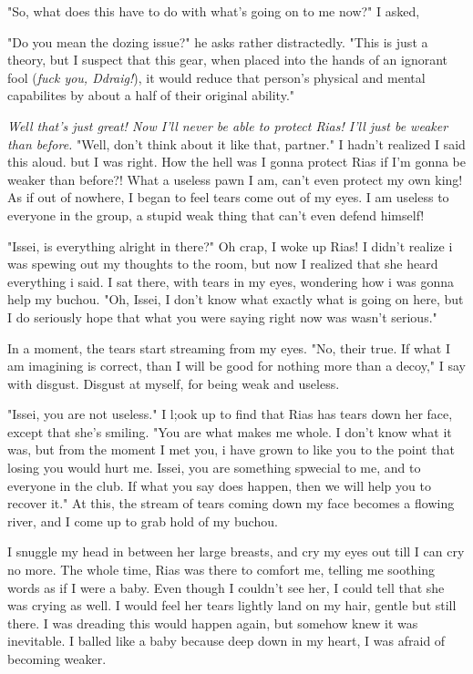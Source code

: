 \documentclass{article}
\begin{document}
"So, what does this have to do with what's going on to me now?" I asked,

"Do you mean the dozing issue?" he asks rather distractedly. "This is just a theory, but I suspect that this gear, when placed into the hands of an ignorant fool (\emph{fuck you, Ddraig!}), it would reduce that person's physical and mental capabilites by about a half of their original ability."

\emph{Well that's just great! Now I'll never be able to protect Rias! I'll just be weaker than before.} "Well, don't think about it like that, partner." I hadn't realized I said this aloud. but I was right. How the hell was I gonna protect Rias if I'm gonna be weaker than before?! What a useless pawn I am, can't even protect my own king! As if out of nowhere, I began to feel tears come out of my eyes. I am useless to everyone in the group, a stupid weak thing that can't even defend himself!

"Issei, is everything alright in there?" Oh crap, I woke up Rias! I didn't realize i was spewing out my thoughts to the room, but now I realized that she heard everything i said. I sat there, with tears in my eyes, wondering how i was gonna help my buchou. "Oh, Issei, I don't know what exactly what is going on here, but I do seriously hope that what you were saying right now was wasn't serious."

In a moment, the tears start streaming from my eyes. "No, their true. If what I am imagining is correct, than I will be good for nothing more than a decoy," I say with disgust. Disgust at myself, for being weak and useless.

"Issei, you are not useless." I l;ook up to find that Rias has tears down her face, except that she's smiling. "You are what makes me whole. I don't know what it was, but from the moment I met you, i have grown to like you to the point that losing you would hurt me. Issei, you are something spwecial to me, and to everyone in the club. If what you say does happen, then we will help you to recover it." At this, the stream of tears coming down my face becomes a flowing river, and I come up to grab hold of my buchou.

I snuggle my head in between her large breasts, and cry my eyes out till I can cry no more. The whole time, Rias was there to comfort me, telling me soothing words as if I were a baby. Even though I couldn't see her, I could tell that she was crying as well. I would feel her tears lightly land on my hair, gentle but still there. I was dreading this would happen again, but somehow knew it was inevitable. I balled like a baby because deep down in my heart, I was afraid of becoming weaker.
\end{document}
